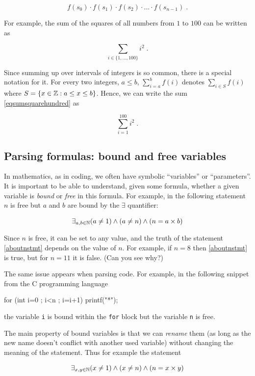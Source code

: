 \[
f(s_0) \cdot f(s_1) \cdot f(s_2) \cdot \ldots \cdot f(s_{n-1}) \;.
\]

For example, the sum of the squares of all numbers from \(1\) to \(100\)
can be written as

\[
\sum_{i\in \{1,\ldots,100\}} i^2 \;. \label{eqsumsquarehundred}
\]

Since summing up over intervals of integers is so common, there is a
special notation for it. For every two integers, \(a \leq b\),
\(\sum_{i=a}^b f(i)\) denotes \(\sum_{i\in S} f(i)\) where
\(S =\{ x\in {\mathbb{Z}} : a \leq x \leq b \}\). Hence, we can write the sum
\eqref{eqsumsquarehundred} as

\[
\sum_{i=1}^{100} i^2 \;.
\]

\subsection{Parsing formulas: bound and free
variables}\label{boundvarsec}

In mathematics, as in coding, we often have symbolic ``variables'' or
``parameters''. It is important to be able to understand, given some
formula, whether a given variable is \emph{bound} or \emph{free} in this
formula. For example, in the following statement \(n\) is free but \(a\)
and \(b\) are bound by the \(\exists\) quantifier:

\[
\exists_{a,b \in \N} (a \neq 1) \wedge (a \neq n) \wedge (n = a \times b) \label{aboutnstmt}
\]

Since \(n\) is free, it can be set to any value, and the truth of the
statement \eqref{aboutnstmt} depends on the value of \(n\). For example,
if \(n=8\) then \eqref{aboutnstmt} is true, but for \(n=11\) it is
false. (Can you see why?)

The same issue appears when parsing code. For example, in the following
snippet from the C programming language

\begin{code}
for (int i=0 ; i<n ; i=i+1) {
    printf("*");
}
\end{code}

the variable \texttt{i} is bound within the \texttt{for} block but the
variable \texttt{n} is free.

The main property of bound variables is that we can \emph{rename} them
(as long as the new name doesn't conflict with another used variable)
without changing the meaning of the statement. Thus for example the
statement

\[
\exists_{x,y \in \N} (x \neq 1) \wedge (x \neq n) \wedge (n = x \times y) \label{aboutnstmttwo}
\]

